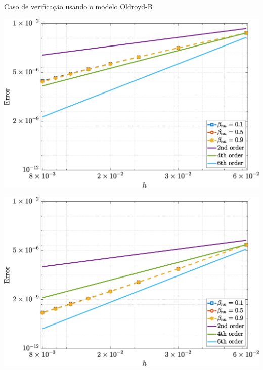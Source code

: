 \begin{frame}{Caso de verificação usando o modelo Oldroyd-B}
    \centering
    \captionsetup{justification=centering}
    \label{fig:oldroydb_2}
    \begin{minipage}{0.49\textwidth}
        \centering
        \includegraphics[width=\textwidth]{Figures/NormErr_2nd_Re_100_Wi_1_epsilon_0_xi_0_alphaG_0_Dt_1e-06_at_0.05_tipsim_1_MMS_12_Wz.eps}
        \label{oldroydb_wz_Case11}
    \end{minipage}
    \hfill
    \begin{minipage}{0.49\textwidth}
        \centering
        \includegraphics[width=\textwidth]{Figures/NormErr_2nd_Re_100_Wi_1_epsilon_0_xi_0_alphaG_0_Dt_1e-06_at_0.05_tipsim_1_MMS_12_Psi.eps}
        \label{oldroydb_psi_Case11}
    \end{minipage}
\end{frame}

